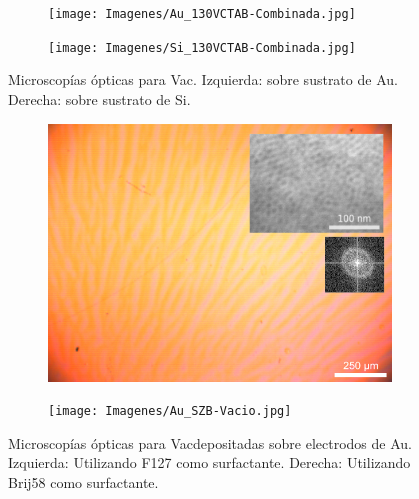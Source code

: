 		 \begin{figure}
		 	   	    \begin{subfigure}{0.495\textwidth}
			       	\texttt{[image: Imagenes/Au\_130VCTAB-Combinada.jpg]}
			   		\end{subfigure}
			   		\begin{subfigure}{0.495\textwidth}
			   	    \texttt{[image: Imagenes/Si\_130VCTAB-Combinada.jpg]}
			   		\end{subfigure}
					 \caption[Microscopía óptica \pdmC\space tratamiento vacío.]{Microscopías ópticas para Vac\pdmC. Izquierda: sobre sustrato de Au. Derecha: sobre sustrato de Si.}
					 \label{fig:Microscopia_CTAB_vacio}	
				     \end{figure}		 	    

		  \begin{figure}
		 	   	    \begin{subfigure}{0.495\textwidth}
			       	\includegraphics[width=\textwidth]{Imagenes/Au_SZF-Vacio.jpg}
			   		\end{subfigure}
			   		\begin{subfigure}{0.495\textwidth}
			   	    \texttt{[image: Imagenes/Au\_SZB-Vacio.jpg]}
			   		\end{subfigure}
					 \caption[Microscopía óptica \pdm\space mixtas Zr/Si.]{Microscopías ópticas para Vac\pdmZ\space depositadas sobre electrodos de Au. Izquierda: Utilizando F127 como surfactante. Derecha: Utilizando Brij58 como surfactante.}
					 \label{fig:Microscopia_ZrSi_vacio}	
				     \end{figure}

